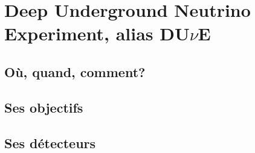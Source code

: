     \section{Deep Underground Neutrino Experiment, alias DU\texorpdfstring{$\nu$}{Lg}E}
        \subsection{Où, quand, comment?}
        \subsection{Ses objectifs}
        \subsection{Ses détecteurs}

\printbibliography